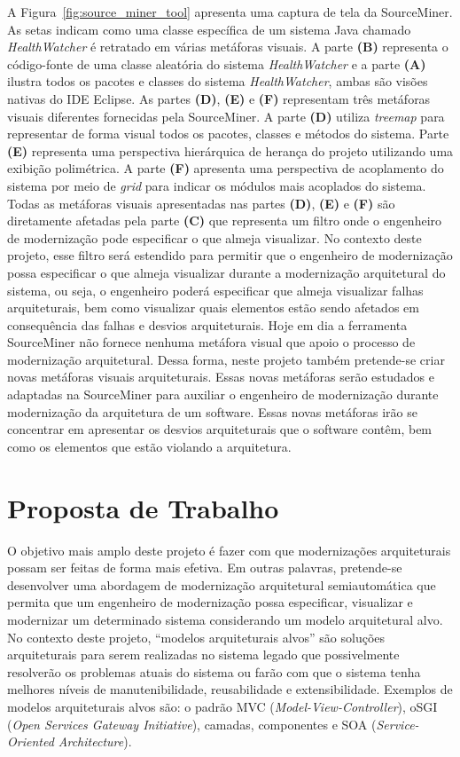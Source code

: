 \documentclass[12pt]{article}
\begin{document}
A Figura~\ref{fig:source_miner_tool} apresenta uma captura de tela da SourceMiner. As setas indicam como uma classe específica de um sistema Java chamado \textit{HealthWatcher} é retratado em várias metáforas visuais. A parte \textbf{(B)} representa o código-fonte de uma classe aleatória do sistema \textit{HealthWatcher} e a parte \textbf{(A)} ilustra todos os pacotes e classes do sistema \textit{HealthWatcher}, ambas são visões nativas do IDE Eclipse. As partes \textbf{(D)}, \textbf{(E)} e \textbf{(F)} representam três metáforas visuais diferentes fornecidas pela SourceMiner. A parte \textbf{(D)} utiliza \textit{treemap} para representar de forma visual todos os pacotes, classes e métodos do sistema. Parte \textbf{(E)} representa uma perspectiva hierárquica de herança do projeto utilizando uma exibição polimétrica. A parte \textbf{(F)} apresenta uma perspectiva de acoplamento do sistema por meio de \textit{grid} para indicar os módulos mais acoplados do sistema. Todas as metáforas visuais apresentadas nas partes \textbf{(D)}, \textbf{(E)} e \textbf{(F)} são diretamente afetadas pela parte \textbf{(C)} que representa um filtro onde o engenheiro de modernização pode especificar o que almeja visualizar. No contexto deste projeto, esse filtro será estendido para permitir que o engenheiro de modernização possa especificar o que almeja visualizar durante a modernização arquitetural do sistema, ou seja, o engenheiro poderá especificar que almeja visualizar falhas arquiteturais, bem como visualizar quais elementos estão sendo afetados em consequência das falhas e desvios arquiteturais. Hoje em dia a ferramenta SourceMiner não fornece nenhuma metáfora visual que apoio o processo de modernização arquitetural. Dessa forma, neste projeto também pretende-se criar novas metáforas visuais arquiteturais. Essas novas metáforas serão estudados e adaptadas na SourceMiner para auxiliar o engenheiro de modernização durante modernização da arquitetura de um software. Essas novas metáforas irão se concentrar em apresentar os desvios arquiteturais que o software contêm, bem como os elementos que estão violando a arquitetura. 

\section{Proposta de Trabalho}\label{sec:proposta_de_trabalho}

O objetivo mais amplo deste projeto é fazer com que modernizações arquiteturais possam ser feitas de forma mais efetiva. Em outras palavras, pretende-se desenvolver uma abordagem de modernização arquitetural semiautomática  que permita que um engenheiro de modernização possa especificar, visualizar e modernizar um determinado sistema considerando um modelo arquitetural alvo. No contexto deste projeto, ``modelos arquiteturais alvos'' são soluções arquiteturais para serem realizadas no sistema legado que possivelmente resolverão os problemas atuais do sistema ou farão com que o sistema tenha melhores níveis de manutenibilidade, reusabilidade e extensibilidade. Exemplos de modelos arquiteturais alvos são: o padrão MVC (\textit{Model-View-Controller}), oSGI (\textit{Open Services Gateway Initiative}), camadas, componentes e SOA (\textit{Service-Oriented Architecture}).
\end{document}
